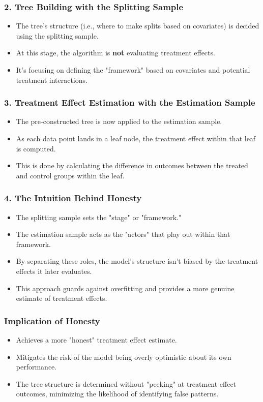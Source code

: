 \documentclass{beamer}
\begin{document}
\begin{frame}
\frametitle{2. Tree Building with the Splitting Sample}
\begin{itemize}
    \item The tree's structure (i.e., where to make splits based on covariates) is decided using the splitting sample.
    \item At this stage, the algorithm is \textbf{not} evaluating treatment effects.
    \item It's focusing on defining the "framework" based on covariates and potential treatment interactions.
\end{itemize}
\end{frame}

\begin{frame}
\frametitle{3. Treatment Effect Estimation with the Estimation Sample}
\begin{itemize}
    \item The pre-constructed tree is now applied to the estimation sample.
    \item As each data point lands in a leaf node, the treatment effect within that leaf is computed.
    \item This is done by calculating the difference in outcomes between the treated and control groups within the leaf.
\end{itemize}
\end{frame}

\begin{frame}
\frametitle{4. The Intuition Behind Honesty}
\begin{itemize}
    \item The splitting sample sets the "stage" or "framework."
    \item The estimation sample acts as the "actors" that play out within that framework.
    \item By separating these roles, the model's structure isn't biased by the treatment effects it later evaluates.
    \item This approach guards against overfitting and provides a more genuine estimate of treatment effects.
\end{itemize}
\end{frame}

\begin{frame}
\frametitle{Implication of Honesty}
\begin{itemize}
    \item Achieves a more "honest" treatment effect estimate.
    \item Mitigates the risk of the model being overly optimistic about its own performance.
    \item The tree structure is determined without "peeking" at treatment effect outcomes, minimizing the likelihood of identifying false patterns.
\end{itemize}
\end{frame}
\end{document}
